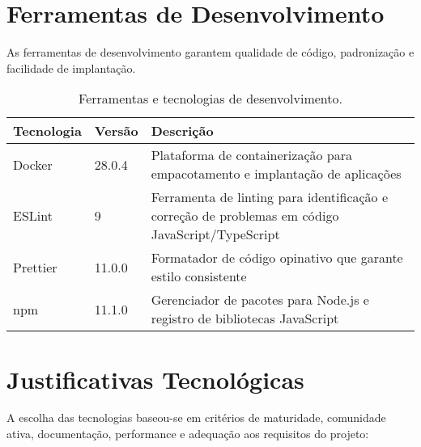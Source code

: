 \section{Ferramentas de Desenvolvimento}

As ferramentas de desenvolvimento garantem qualidade de código, padronização e facilidade de implantação.

\begin{table}[H]
  \centering
  \caption{Ferramentas e tecnologias de desenvolvimento.}
  \label{tab:tecnologias-desenvolvimento}
  \begin{tabular}{|p{3cm}|p{2cm}|p{8cm}|}
    \hline
    \textbf{Tecnologia} & \textbf{Versão} & \textbf{Descrição}                                                                               \\
    \hline
    Docker              & 28.0.4          & Plataforma de containerização para empacotamento e implantação de aplicações                     \\
    \hline
    ESLint              & 9               & Ferramenta de linting para identificação e correção de problemas em código JavaScript/TypeScript \\
    \hline
    Prettier            & 11.0.0          & Formatador de código opinativo que garante estilo consistente                                    \\
    \hline
    npm                 & 11.1.0          & Gerenciador de pacotes para Node.js e registro de bibliotecas JavaScript                         \\
    \hline
  \end{tabular}
\end{table}

\section{Justificativas Tecnológicas}

A escolha das tecnologias baseou-se em critérios de maturidade, comunidade ativa, documentação, performance e adequação aos requisitos do projeto:

